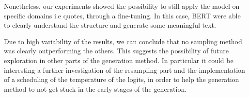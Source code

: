\documentclass[10pt,twocolumn,letterpaper]{article}
\begin{document}
Nonetheless, our experiments showed the possibility to still apply the model
on specific domains i.e quotes, through a fine-tuning.
In this case, BERT were able to clearly understand
the structure and generate some meaningful text.

Due to high variability of the results, we can conclude that no sampling method was clearly
outperforming the others. This suggests the possibility of future exploration in other parts
of the generation method. In particular it could be interesting a further investigation
of the resampling part and the implementation of a scheduling of the temperature of the logits,
in order to help the generation method to not get stuck in the early stages of the generation.


\end{document}
